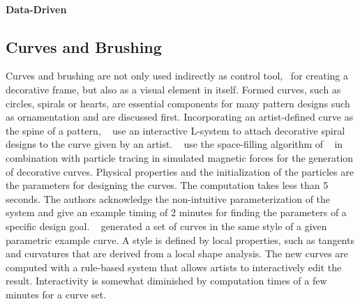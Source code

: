 \paragraph*{Data-Driven}
\label{para:analysis_rulebased_sketchbased_datadriven}


\subsection{Curves and Brushing}
\label{subsec:analysis_curves}

Curves and brushing are not only used indirectly as control tool, \eg~for creating a decorative frame, but also as a visual element in itself. Formed curves, such as circles, spirals or hearts, are essential components for many pattern designs such as ornamentation and are discussed first. 
Incorporating an artist-defined curve as the spine of a pattern, \citeauthor*{yu_2012_ans}~\cite{yu_2012_ans} use an interactive L-system to attach decorative spiral designs to the curve given by an artist. \citeauthor*{xu_2009_mcc}~\cite{xu_2009_mcc} use the space-filling algorithm of \citeauthor*{wong_1998_cgf}~\cite{wong_1998_cgf} in combination with particle tracing in simulated magnetic forces for the generation of decorative curves. Physical properties and the initialization of the particles are the parameters for designing the curves. The computation takes less than 5 seconds. The authors acknowledge the non-intuitive parameterization of the system and give an example timing of 2 minutes for finding the parameters of a specific design goal. \citeauthor*{merrell_2010_ecs}~\cite{merrell_2010_ecs} generated a set of curves in the same style of a given parametric example curve. A style is defined by local properties, such as tangents and curvatures that are derived from a local shape analysis. The new curves are computed with a rule-based system that allows artists to interactively edit the result. Interactivity is somewhat diminished by computation times of a few minutes for a curve set. 

